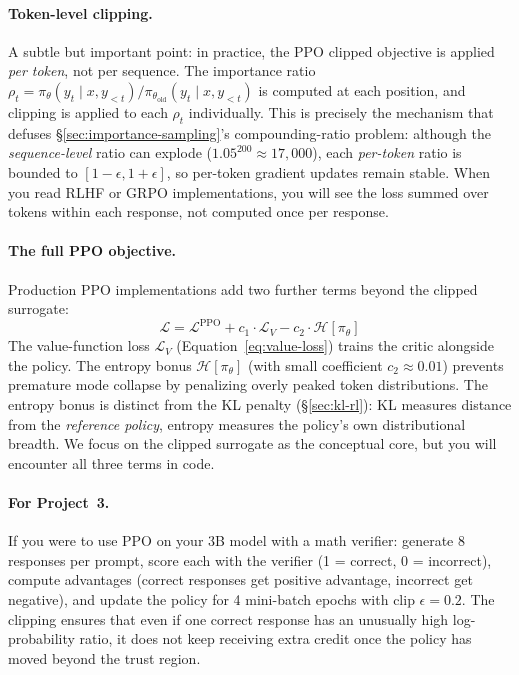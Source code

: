 \paragraph{Token-level clipping.} A subtle but important point: in practice, the PPO clipped objective is applied \emph{per token}, not per sequence. The importance ratio $\rho_t = \pi_\theta(y_t \mid x, y_{<t}) / \pi_{\theta_{\text{old}}}(y_t \mid x, y_{<t})$ is computed at each position, and clipping is applied to each $\rho_t$ individually. This is precisely the mechanism that defuses \S\ref{sec:importance-sampling}'s compounding-ratio problem: although the \emph{sequence-level} ratio can explode ($1.05^{200} \approx 17{,}000$), each \emph{per-token} ratio is bounded to $[1{-}\epsilon, 1{+}\epsilon]$, so per-token gradient updates remain stable. When you read RLHF or GRPO implementations, you will see the loss summed over tokens within each response, not computed once per response.

\paragraph{The full PPO objective.} Production PPO implementations add two further terms beyond the clipped surrogate:
\[
\mathcal{L} = \mathcal{L}^{\text{PPO}} + c_1 \cdot \mathcal{L}_V - c_2 \cdot \mathcal{H}[\pi_\theta]
\]
The value-function loss $\mathcal{L}_V$ (Equation~\ref{eq:value-loss}) trains the critic alongside the policy. The entropy bonus $\mathcal{H}[\pi_\theta]$ (with small coefficient $c_2 \approx 0.01$) prevents premature mode collapse by penalizing overly peaked token distributions. The entropy bonus is distinct from the KL penalty (\S\ref{sec:kl-rl}): KL measures distance from the \emph{reference policy}, entropy measures the policy's own distributional breadth. We focus on the clipped surrogate as the conceptual core, but you will encounter all three terms in code.

\paragraph{For Project~3.} If you were to use PPO on your 3B model with a math verifier: generate 8 responses per prompt, score each with the verifier (1 = correct, 0 = incorrect), compute advantages (correct responses get positive advantage, incorrect get negative), and update the policy for 4 mini-batch epochs with clip $\epsilon = 0.2$. The clipping ensures that even if one correct response has an unusually high log-probability ratio, it does not keep receiving extra credit once the policy has moved beyond the trust region.

